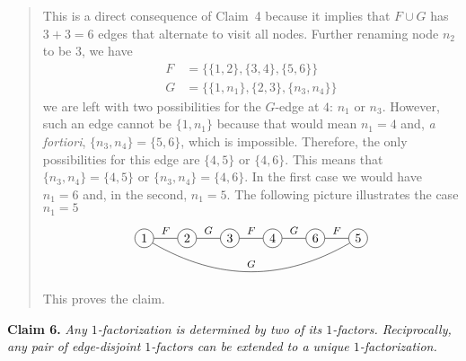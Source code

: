 \begin{solution}
\begin{description}
        \begin{quote}
            This is a direct consequence of Claim~4 because it implies that $F\cup G$ has $3+3=6$ edges that alternate to visit all nodes. Further renaming node $n_2$ to be $3$, we have
             \begin{align*}
                F &= \{\{1,2\},\{3,4\},\{5,6\}\}\\
                G &= \{\{1,n_1\},\{2,3\},\{n_3,n_4\}\}
            \end{align*}
            we are left with two possibilities for the $G$-edge at $4$: $n_1$ or $n_3$. However, such an edge cannot be $\{1,n_1\}$ because that would mean $n_1=4$ and, \textit{a fortiori}, $\{n_3,n_4\}=\{5,6\}$, which is impossible. Therefore, the only possibilities for this edge are $\{4,5\}$ or $\{4,6\}$. This means that $\{n_3,n_4\}=\{4,5\}$ or $\{n_3,n_4\}=\{4,6\}$. In the first case we would have $n_1=6$ and, in the second, $n_1=5$. The following picture illustrates the case $n_1=5$
            $$
                \begin{tikzpicture}[
                    scale=0.8,
                    vertex/.style={circle,
                    draw,
                    minimum size=1.5em,
                    inner sep=0pt,
                    align=center},
                    baseline=(1.base),
                    factor/.style={font=\footnotesize}
                ]
                    \node[vertex] (1) at (0,0) {$1$};
                    \node[vertex] (2) at (1.5,0) {$2$};
                    \node[vertex] (3) at (3,0) {$3$};
                    \node[vertex] (4) at (4.5,0) {$4$};
                    \node[vertex] (n3) at (6,0) {$6$};
                    \node[vertex] (n4) at (7.5,0) {$5$};
                    
                    \draw[factor] (1) -- node[above] {$F$} (2);
                    \draw[factor] (2) -- node[above] {$G$} (3);
                    \draw[factor] (3) -- node[above] {$F$} (4);
                    \draw[factor] (4) -- node[above] {$G$} (n3);
                    \draw[factor] (n3) -- node[above] {$F$} (n4);
                    \draw[factor] (n4) to[bend left=30] node[above] {$G$} (1);
                \end{tikzpicture}
            $$
            This proves the claim.
        \end{quote}

        \textbf{Claim 6.} \textit{Any\/ $1$-factorization is determined by two of its\/ $1$-factors. Reciprocally, any pair of edge-disjoint\/ $1$-factors can be extended to a unique\/ $1$-factorization.}


\end{description}
\end{solution}
